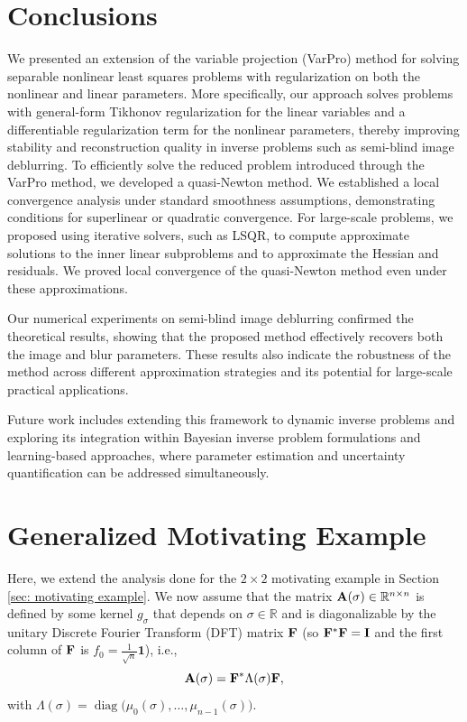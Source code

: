 \documentclass[onefignum,onetabnum]{siamart171218}
\newcommand{\bA}{{\bf A}}
\newcommand{\bF}{{\bf F}}
\newcommand{\bI}{{\bf I}}
\begin{document}
\section{Conclusions}\label{section: conclusions}
We presented an extension of the variable projection (VarPro) method for solving separable nonlinear least squares problems with regularization on both the nonlinear and linear parameters. More specifically, our approach solves problems with general-form Tikhonov regularization for the linear variables and a differentiable regularization term for the nonlinear parameters, thereby improving stability and reconstruction quality in inverse problems such as semi-blind image deblurring. 
To efficiently solve the reduced problem introduced through the VarPro method, we developed a quasi-Newton method. We established a local convergence analysis under standard smoothness assumptions, demonstrating conditions for superlinear or quadratic convergence. For large-scale problems, we proposed using iterative solvers, such as LSQR, to compute approximate solutions to the inner linear subproblems and to approximate the Hessian and residuals. We proved local convergence of the quasi-Newton method even under these approximations. 

Our numerical experiments on semi-blind image deblurring confirmed the theoretical results, showing that the proposed method effectively recovers both the image and blur parameters. These results also indicate the robustness of the method across different approximation strategies and its potential for large-scale practical applications.  

Future work includes extending this framework to dynamic inverse problems and exploring its integration within Bayesian inverse problem formulations and learning-based approaches, where parameter estimation and uncertainty quantification can be addressed simultaneously.

\appendix
\section{Generalized Motivating Example}\label{appendix}
Here, we extend the analysis done for the $2\times 2$ motivating example in Section \ref{sec: motivating example}. We now assume that the matrix \(\bA(\sigma)\in \mathbb{R}^{n\times n}\) is defined by some kernel \(g_\sigma\) that depends on \(\sigma\in \mathbb{R}\) and  is diagonalizable by the unitary Discrete Fourier Transform (DFT) matrix  \(\bF\) (so \(\bF^\ast\bF=\bI\) and the first column of \(\bF\) is \(f_0=\tfrac{1}{\sqrt n}\mathbf 1\)), i.e.,
\[
\bA(\sigma)=\bF^\ast \Lambda(\sigma)\bF,
\]
with \(\Lambda(\sigma)=\operatorname{diag}\!\big(\mu_0(\sigma),\dots,\mu_{n-1}(\sigma)\big)\). 
\end{document}
